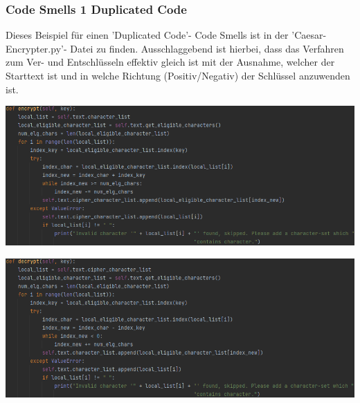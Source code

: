 \documentclass[12pt]{article}
\begin{document}
\subsubsection{Code Smells 1 Duplicated Code}
Dieses Beispiel für einen 'Duplicated Code'- Code Smells ist in der 'Caesar-Encrypter.py'- Datei zu finden. Ausschlaggebend ist hierbei, dass das Verfahren zum Ver- und Entschlüsseln effektiv gleich ist mit der Ausnahme, welcher der Starttext ist und in welche Richtung (Positiv/Negativ) der Schlüssel anzuwenden ist.
\begin{center}
	\includegraphics[width=15cm]{bilder/CodeSmells1_a.png}
\end{center}
\begin{center}
	\includegraphics[width=15cm]{bilder/CodeSmells1_b.png}
\end{center}
\end{document}
